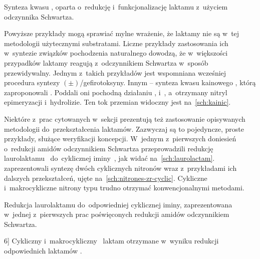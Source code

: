 \begin{scheme*}
  
  \caption{
    Synteza kwasu  , oparta o~redukcję
    i~funkcjonalizację laktamu  z~użyciem odczynnika Schwartza.
  }
  \label{sch:kainic}
\end{scheme*}
Powyższe przykłady mogą sprawiać mylne wrażenie, że laktamy nie są w~tej metodologii
  użytecznymi substratami.
Liczne przykłady zastosowania ich w~syntezie związków pochodzenia naturalnego dowodzą,
  że w~większości przypadków laktamy reagują z~odczynnikiem Schwartza w~sposób przewidywalny.
Jednym z~takich przykładów jest wspomniana wcześniej procedura syntezy
  $(\pm)$\-/gefirotoksyny.
Innym \--- synteza kwasu kainowego , którą zaproponowali
  \citeauthor{xia01}.
Poddali oni pochodną   działaniu \schwartz{},
  i~, a~otrzymany nitryl  epimeryzacji i~hydrolizie.
Ten tok przemian widoczny jest na~\cref{sch:kainic}.

Niektóre z~prac cytowanych w~sekcji \textit{} prezentują też
  zastosowanie opisywanych metodologii do~przekształcenia laktamów.
Zazwyczaj są to pojedyncze, proste przykłady, służące weryfikacji koncepcji.
W~jednym z~pierwszych doniesień o~redukcji amidów odczynnikiem Schwartza \citeauthor{schedler93}
  przeprowadzili redukcję laurolaktamu~ do~cyklicznej
  iminy~, jak widać na~\cref{sch:laurolactam}.
\citeauthor{katahara17} zaprezentowali syntezę dwóch cyklicznych nitronów wraz z~przykładami ich
  dalszych przekształceń, ujęte na~\cref{sch:nitrones-zr-cyclic}.
Cykliczne i~makrocykliczne nitrony typu  trudno
  otrzymać konwencjonalnymi metodami.
\begin{marginscheme}[-25\baselineskip]
  
  \caption{
    Redukcja laurolaktamu do~odpowiedniej cyklicznej iminy, zaprezentowana w~jednej z~pierwszych
      prac poświęconych redukcji amidów odczynnikiem Schwartza.
    }
    \label{sch:laurolactam}
\end{marginscheme}
\begin{scheme*}
  
  \caption[][6\baselineskip]{
    Cykliczny  i~makrocykliczny~ laktam
      otrzymane w~wyniku redukcji odpowiednich laktamów .
  }
  \label{sch:nitrones-zr-cyclic}
\end{scheme*}

